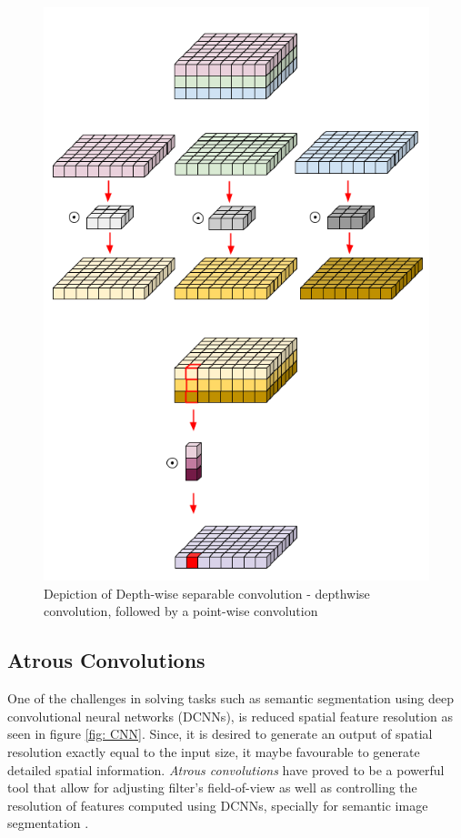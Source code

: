 \begin{figure}[!ht]
	 \centering 
\includegraphics[scale = 0.6
]{Graphics/Fundamentals/Depthwise_seperable_convolution} 
	\caption[Depth-wise Separable Convolution]{Depiction of Depth-wise separable convolution - depthwise convolution, followed by a point-wise convolution \cite{DEPTHWISESEPCONV}}
	\label{fig: depthwiseseperableconv} 
\end{figure}



\subsection{Atrous Convolutions}
One of the challenges in solving tasks such as semantic segmentation using deep convolutional neural networks (DCNNs),  is reduced spatial feature resolution as seen in figure \ref{fig: CNN}. Since, it is desired to generate an output of spatial resolution exactly equal to the input size, it maybe favourable to generate detailed spatial information. \textit{Atrous convolutions} have proved to be a powerful tool that allow for adjusting filter’s field-of-view as well as controlling the resolution of features computed using DCNNs, specially for semantic image segmentation \cite{Chen2018dlv3}.

